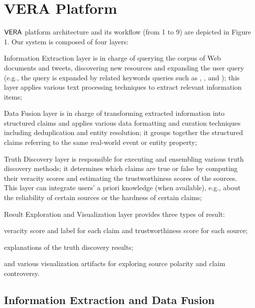 \section{VERA Platform}


$\mathsf{VERA}$ platform architecture and its workflow (from 1 to 9) are depicted in Figure 1. Our system is composed of four layers:
\begin{inparaenum}[(1)]
\item Information Extraction layer is in charge of querying the corpus of Web documents and tweets, discovering new resources and expanding the user query (e.g., the query  is expanded by related keywords queries such as  ,
, and ); this layer applies various text processing techniques to extract relevant information items; 
\item Data Fusion layer is in charge of   transforming extracted information  into structured claims and applies various data formatting and curation techniques including deduplication and entity resolution; it groups together the structured claims referring to the same real-world event or entity property; 
\item Truth Discovery layer is responsible for executing and ensembling various truth discovery methods; it determines  which claims are true or false by computing their veracity scores and estimating the trustworthiness scores of the sources. This layer can integrate users' a priori knowledge (when available), e.g., about the reliability of certain sources or the hardness of certain claims;
\item Result Exploration and Visualization layer provides three  types of result: 
\begin{inparaenum}[(i)]
\item veracity score and label for each claim and trustworthiness score for each source;
\item explanations of the truth discovery results;
\item and various visualization artifacts for exploring source polarity and claim controversy.
\end{inparaenum}
\end{inparaenum}

\subsection{Information Extraction and Data Fusion}\label{openie}

